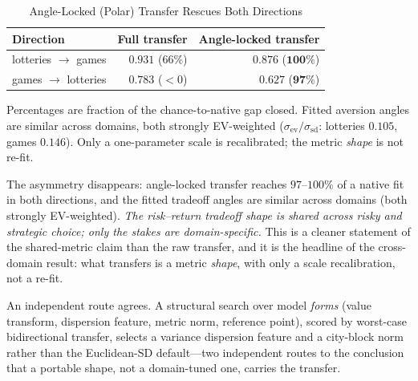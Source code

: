 \documentclass[journal]{IEEEtran}
\begin{document}
\begin{table}[!t]
\renewcommand{\arraystretch}{1.15}
\caption{Angle-Locked (Polar) Transfer Rescues Both Directions}
\label{tab:polar}
\centering
\begin{tabular}{l r r}
\toprule
\textbf{Direction} & \textbf{Full transfer} & \textbf{Angle-locked transfer} \\
\midrule
lotteries $\to$ games & $0.931$ \; ($66\%$) & $\mathbf{0.876}$ \; ($\mathbf{100\%}$) \\
games $\to$ lotteries & $0.783$ \; ($<0$)   & $\mathbf{0.627}$ \; ($\mathbf{97\%}$) \\
\bottomrule
\end{tabular}
\begin{flushleft}
\footnotesize{Percentages are fraction of the chance-to-native gap closed. Fitted aversion angles are similar across domains, both strongly EV-weighted ($\sigma_{\mathrm{ev}}/\sigma_{\mathrm{sd}}$: lotteries $0.105$, games $0.146$). Only a one-parameter scale is recalibrated; the metric \emph{shape} is not re-fit.}
\end{flushleft}
\end{table}

The asymmetry disappears: angle-locked transfer reaches $97$--$100\%$ of a native fit in both directions, and the fitted tradeoff angles are similar across domains (both strongly EV-weighted).
\emph{The risk--return tradeoff shape is shared across risky and strategic choice; only the stakes are domain-specific.}
This is a cleaner statement of the shared-metric claim than the raw transfer, and it is the headline of the cross-domain result: what transfers is a metric \emph{shape}, with only a scale recalibration, not a re-fit.

An independent route agrees.
A structural search over model \emph{forms} (value transform, dispersion feature, metric norm, reference point), scored by worst-case bidirectional transfer, selects a variance dispersion feature and a city-block norm rather than the Euclidean-SD default---two independent routes to the conclusion that a portable shape, not a domain-tuned one, carries the transfer.
\end{document}
